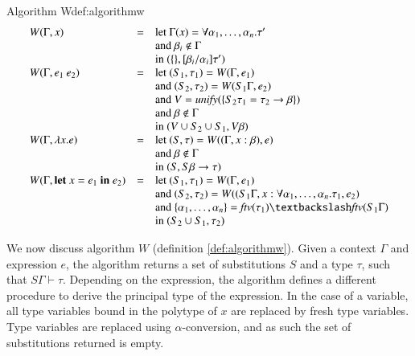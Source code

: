 \begin{definitiontitled}{Algorithm W}{def:algorithmw}
\[
\begin{array}{l c l}
W(\Gamma,x)           & = & \text{let } \Gamma(x) = \forall \alpha_1,\ldots,\alpha_n.\tau' \\ 
                      &   & \text{and } \beta_i \notin \Gamma \\
                      &   & \text{in } (\{\},[\beta_i/\alpha_i]\tau') \\
W(\Gamma,e_1 \: e_2)  & = & \text{let }   (S_1,\tau_1) = W(\Gamma, e_1)\\
                      &   & \text{and }   (S_2,\tau_2) = W(S_1 \Gamma, e_2)\\
                      &   & \text{and }   V            = \textit{unify}(\{S_2\tau_1 = \tau_2 \to \beta\}) \\
                      &   & \text{and }   \beta \notin \Gamma \\
                      &   & \text{in }    (V \cup S_2 \cup S_1, V \beta) \\
W(\Gamma,\lambda x.e) & = & \text{let }   (S,\tau) = W((\Gamma,x:\beta),e)\\
                      &   & \text{and }   \beta \notin \Gamma \\ 
                      &   & \text{in }    (S, S\beta \to \tau) \\
W(\Gamma,\textbf{let } x = e_1 \textbf{ in } e_2) & = & \text{let } (S_1,\tau_1) = W(\Gamma,e_1) \\
                                                  &   & \text{and   } (S_2,\tau_2) = W((S_1\Gamma,x : \forall \alpha_1,\ldots,\alpha_n.\tau_1, e_2) \\
                                                  &   & \text{and   } \{ \alpha_1, \ldots, \alpha_n \} = \textit{ftv}(\tau_1) \textbackslash \textit{ftv}(S_1\Gamma) \\
                                                  &   & \text{in } (S_2 \cup S_1, \tau_2) \\
\end{array}
\]
\end{definitiontitled}

We now discuss algorithm $W$ (definition \ref{def:algorithmw}).
Given a context $\Gamma$ and expression $e$, the algorithm returns a set of substitutions $S$ and a type $\tau$, such that $S\Gamma \vdash \tau$.
Depending on the expression, the algorithm defines a different procedure to derive the principal type of the expression.
In the case of a variable, all type variables bound in the polytype of $x$ are replaced by fresh type variables.
Type variables are replaced using $\alpha$-conversion, and as such the set of substitutions returned is empty.

